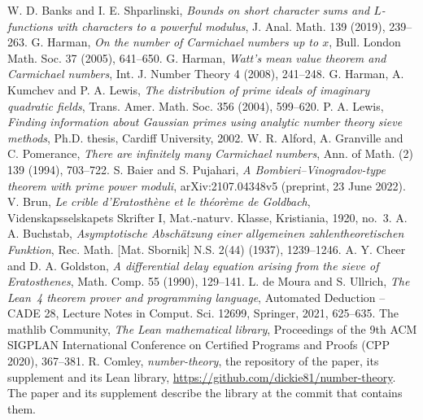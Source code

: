 W. D. Banks and I. E. Shparlinski, \emph{Bounds on short character sums and $L$-functions
  with characters to a powerful modulus}, J. Anal. Math. 139 (2019), 239--263.
 G. Harman, \emph{On the number of Carmichael numbers up to $x$}, Bull. London Math. Soc. 37 (2005),
  641--650.
 G. Harman, \emph{Watt's mean value theorem and Carmichael numbers}, Int. J. Number Theory 4 (2008),
  241--248.
 G. Harman, A. Kumchev and P. A. Lewis, \emph{The distribution of prime ideals of imaginary quadratic
  fields}, Trans. Amer. Math. Soc. 356 (2004), 599--620.
 P. A. Lewis, \emph{Finding information about Gaussian primes using analytic number theory
  sieve methods}, Ph.D. thesis, Cardiff University, 2002.
 W. R. Alford, A. Granville and C. Pomerance, \emph{There are infinitely many Carmichael numbers}, Ann.
  of Math. (2) 139 (1994), 703--722.
 S. Baier and S. Pujahari, \emph{A Bombieri--Vinogradov-type theorem with prime power moduli},
  arXiv:2107.04348v5 (preprint, 23 June 2022).
 V. Brun, \emph{Le crible d'Eratosth\`ene et le th\'eor\`eme de Goldbach}, Videnskapsselskapets
  Skrifter I, Mat.-naturv. Klasse, Kristiania, 1920, no.~3.
 A. A. Buchstab, \emph{Asymptotische Absch\"atzung einer allgemeinen zahlentheoretischen
  Funktion}, Rec. Math. [Mat. Sbornik] N.S. 2(44) (1937), 1239--1246.
 A. Y. Cheer and D. A. Goldston, \emph{A differential delay equation arising from the sieve of
  Eratosthenes}, Math. Comp. 55 (1990), 129--141.
 L. de Moura and S. Ullrich, \emph{The Lean~4 theorem prover and programming language}, Automated
  Deduction -- CADE 28, Lecture Notes in Comput. Sci. 12699, Springer, 2021, 625--635.
 The mathlib Community, \emph{The Lean mathematical library}, Proceedings of the 9th ACM SIGPLAN
  International Conference on Certified Programs and Proofs (CPP 2020), 367--381.
 R. Comley, \emph{number-theory}, the repository of the paper, its supplement and its Lean library,
  \url{https://github.com/dickie81/number-theory}. The paper and its supplement describe the library at the commit
  that contains them.
